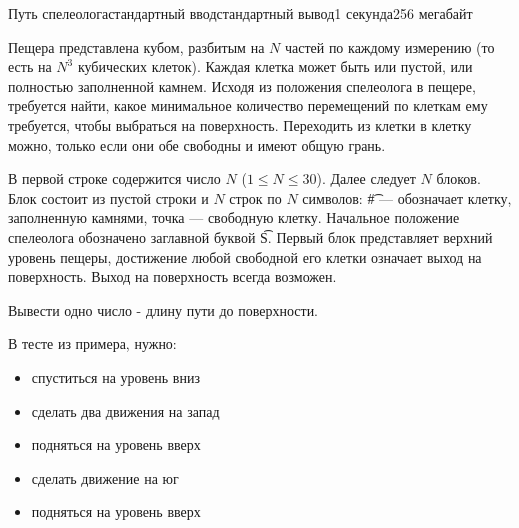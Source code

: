 \begin{problem}{Путь спелеолога}{стандартный ввод}{стандартный вывод}{1 секунда}{256 мегабайт}

Пещера представлена кубом, разбитым на $N$ частей по каждому измерению (то есть на $N^3$ кубических клеток). Каждая клетка может быть или пустой, или полностью заполненной камнем. Исходя из положения спелеолога в пещере, требуется найти, какое минимальное количество перемещений по клеткам ему требуется, чтобы выбраться на поверхность. Переходить из клетки в клетку можно, только если они обе свободны и имеют общую грань.

\InputFile
В первой строке содержится число $N$ ($1 \le N \le 30$). Далее следует $N$ блоков. Блок состоит из пустой строки и $N$ строк по $N$ символов: \t{\#} --- обозначает клетку, заполненную камнями, точка --- свободную клетку. Начальное положение спелеолога обозначено заглавной буквой \t{S}. Первый блок представляет верхний уровень пещеры, достижение любой свободной его клетки означает выход на поверхность. Выход на поверхность всегда возможен.

\OutputFile
Вывести одно число - длину пути до поверхности.

\Example

\begin{example}
%
\end{example}

\Note
В тесте из примера, нужно:
\begin{itemize}
\item спуститься на уровень вниз
\item сделать два движения на запад
\item подняться на уровень вверх
\item сделать движение на юг
\item подняться на уровень вверх
\end{itemize}

\end{problem}

